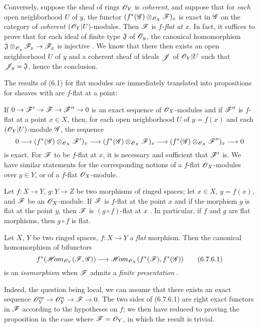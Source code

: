 \begin{env}[6.7.3]
\label{0.6.7.3}
Conversely, suppose the sheaf of rings $\mathscr{O}_Y$ is {\em coherent}, and suppose that for
{\em each} open neighborhood $U$ of $y$, the functor $(f^*(\mathscr{G})\otimes_{\mathscr{O}_X}\mathscr{F})_x$
is exact in $\mathscr{G}$ on the category of {\em coherent} $(\mathscr{O}_Y|U)$-modules. Then $\mathscr{F}$ is
{\em $f$-flat at $x$}. In fact, it suffices to prove that for each ideal of finite type
$\mathfrak{J}$ of $\mathscr{O}_y$, the canonical homomorphism
$\mathfrak{J}\otimes_{\mathscr{O}_y}\mathscr{F}_x\to\mathscr{F}_x$ is injective . We know
 that there then exists an open neighborhood
$U$ of $y$ and a coherent sheaf of ideals $\mathscr{J}$ of $\mathscr{O}_Y|U$ such that
$\mathscr{J}_y=\mathfrak{J}$, hence the conclusion.
\end{env}

\begin{env}[6.7.4]
\label{0.6.7.4}
The results of (6.1) for flat modules are immediately translated into propositions for
sheaves with are $f$-flat at a point:

If $0\to\mathscr{F}'\to\mathscr{F}\to\mathscr{F}''\to 0$ is an exact sequence of $\mathscr{O}_X$-modules and if
$\mathscr{F}''$ is $f$-flat at a point $x\in X$, then, for each open neighborhood $U$ of $y=f(x)$
and each $(\mathscr{O}_Y|U)$-module $\mathscr{G}$, the sequence
\[
  0\longrightarrow(f^*(\mathscr{G})\otimes_{\mathscr{O}_X}\mathscr{F}')_x
  \longrightarrow(f^*(\mathscr{G})\otimes_{\mathscr{O}_X}\mathscr{F})_x
  \longrightarrow(f^*(\mathscr{G})\otimes_{\mathscr{O}_X}\mathscr{F}'')_x\longrightarrow 0
\]
is exact. For $\mathscr{F}$ to be $f$-flat at $x$, it is necessary and sufficient that $\mathscr{F}'$
is. We have similar statements for the corresponding notions of a $f$-flat $\mathscr{O}_X$-modules
over $y\in Y$, or of a $f$-flat $\mathscr{O}_X$-module.
\end{env}

\begin{env}[6.7.5]
\label{0.6.7.5}
Let $f:X\to Y$, $g:Y\to Z$ be two morphisms of ringed spaces; let $x\in X$, $y=f(x)$, and
$\mathscr{F}$ be an $\mathscr{O}_X$-module. If $\mathscr{F}$ is $f$-flat at the point $x$ and if the morphism
$g$ is flat at the point $y$, then $\mathscr{F}$ is $(g\circ f)$-flat at $x$ . In
particular, if $f$ and $g$ are flat morphisms, then $g\circ f$ is flat.
\end{env}

\begin{env}[6.7.6]
\label{0.6.7.6}
Let $X$, $Y$ be two ringed spaces, $f:X\to Y$ a {\em flat} morphism. Then the canonical
homomorphism of bifunctors 
\[
  f^*(\mathscr{H}\!{om}_{\mathscr{O}_Y}(\mathscr{F},\mathscr{G}))\longrightarrow\mathscr{H}\!{om}_{\mathscr{O}_X}(f^*(\mathscr{F}),f^*(\mathscr{G}))
  \tag{6.7.6.1}
\]
is an {\em isomorphism} when $\mathscr{F}$ admits a {\em finite presentation} .

Indeed, the question being local, we can assume that there exists an exact sequence
$\mathscr{O}_Y^m\to\mathscr{O}_Y^n\to\mathscr{F}\to 0$. The two sides of (6.7.6.1) are right exact functors in
$\mathscr{F}$ according to the hypotheses on $f$; we then have reduced to proving the proposition
in the case where $\mathscr{F}=\mathscr{O}_Y$, in which the result is trivial.
\end{env}

